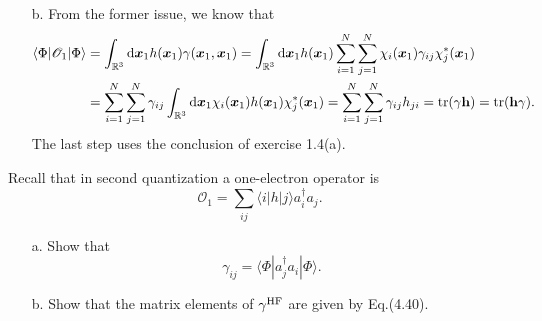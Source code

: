 \documentclass[a4paper]{book}
\newcommand\tr[1]{\mathrm{tr(#1)}}
\newcommand*{\dif}{\mathop{}\!\mathrm{d}}
\newcommand{\HF}{{\rm HF}}
\newcommand{\h}{{\bf h}}
\begin{document}
\begin{solution}
\begin{itemize}
	\item[b.] From the former issue, we know that 	
	\begin{align*}
		\langle \Phi | \mathscr{O}_1 | \Phi \rangle &= \int_{ \mathbb{R}^3 } \dif \boldsymbol{x}_1 h( \boldsymbol{x}_1 ) \gamma( \boldsymbol{x}_1 , \boldsymbol{x}_1 ) = \int_{ \mathbb{R}^3 } \dif \boldsymbol{x}_1 h( \boldsymbol{x}_1 ) \sum_{ i=1 }^N \sum_{ j=1 }^N \chi_i( \boldsymbol{x}_1 ) \gamma_{ij} \chi^*_j( \boldsymbol{x}_1 ) \\
		&= \sum_{ i=1 }^N \sum_{ j=1 }^N \gamma_{ij} \int_{ \mathbb{R}^3 } \dif \boldsymbol{x}_1 \chi_i( \boldsymbol{x}_1 ) h( \boldsymbol{x}_1 ) \chi^*_j( \boldsymbol{x}_1 ) = \sum_{ i=1 }^N \sum_{ j=1 }^N \gamma_{ij} h_{ji} = \tr{\gamma \h} = \tr{\h \gamma}.
	\end{align*}
	The last step uses the conclusion of exercise 1.4(a).
	\end{itemize}		
	
	\end{solution}
	
	\begin{exercise}
	Recall that in second quantization a one-electron operator is
	\[
		\mathscr{O}_1 = \sum_{ij} \langle i | h | j \rangle a^\dagger_i a_j.
	\]
	\begin{enumerate}
	
	\item[a.] Show that
	\[
		\gamma_{ij} = \langle \Phi | a^\dagger_j a_i | \Phi \rangle.
	\]
	
	\item[b.] Show that the matrix elements of $\gamma^{\HF}$ are given by Eq.(4.40).
	
	\end{enumerate}
	\end{exercise}
	
\end{document}
